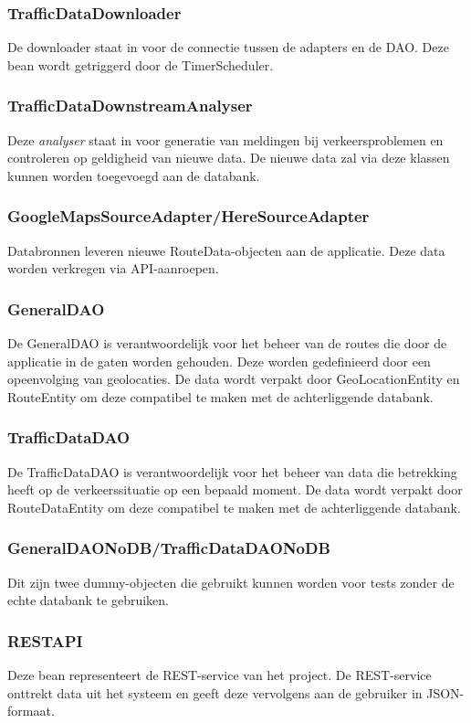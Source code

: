 \documentclass[ps,a4paper,oneside]{report}
\begin{document}
\subsubsection{TrafficDataDownloader}
De downloader staat in voor de connectie tussen de adapters en de DAO. Deze bean wordt getriggerd door de TimerScheduler.
\subsubsection{TrafficDataDownstreamAnalyser}
Deze \textit{analyser} staat in voor generatie van meldingen bij verkeersproblemen en controleren op geldigheid van nieuwe data. De nieuwe data zal via deze klassen kunnen worden toegevoegd aan de databank.
\subsubsection{GoogleMapsSourceAdapter/HereSourceAdapter}
Databronnen leveren nieuwe RouteData-objecten aan de applicatie. Deze data worden verkregen via API-aanroepen.
\subsubsection{GeneralDAO}
De GeneralDAO is verantwoordelijk voor het beheer van de routes die door de applicatie in de gaten worden gehouden. Deze worden gedefinieerd door een opeenvolging van geolocaties. De data wordt verpakt door GeoLocationEntity en RouteEntity om deze compatibel te maken met de achterliggende databank.
\subsubsection{TrafficDataDAO}
De TrafficDataDAO is verantwoordelijk voor het beheer van data die betrekking heeft op de verkeerssituatie op een bepaald moment. De data wordt verpakt door RouteDataEntity om deze compatibel te maken met de achterliggende databank.
\subsubsection{GeneralDAONoDB/TrafficDataDAONoDB}
Dit zijn twee dummy-objecten die gebruikt kunnen worden voor tests zonder de echte databank te gebruiken.
\subsubsection{RESTAPI}
Deze bean representeert de REST-service van het project. De REST-service onttrekt data uit het systeem en geeft deze vervolgens aan de gebruiker in JSON-formaat.
\end{document}
